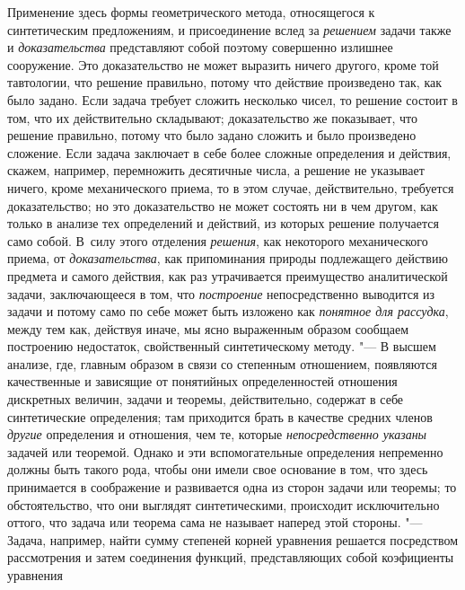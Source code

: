 {{Применение здесь формы геометрического метода, относящегося к
синтетическим предложениям, и присоединение вслед за
{\em решением} задачи
также и {\em доказательства}
представляют собой поэтому совершенно излишнее сооружение.
Это доказательство не может выразить ничего другого, кроме той тавтологии,
что решение правильно, потому что действие произведено так, как было
задано. Если задача требует сложить несколько чисел, то решение состоит в
том, что их действительно складывают; доказательство же показывает, что
решение правильно, потому что было задано сложить и было произведено
сложение. Если задача заключает в себе более сложные определения и
действия, скажем, например, перемножить десятичные
числа,
а решение не указывает ничего, кроме механического приема, то
в этом случае, действительно, требуется доказательство; но это
доказательство не может состоять ни в чем другом, как только в анализе тех
определений и действий, из которых решение получается само собой. В~силу
этого отделения {\em решения},
как некоторого механического приема, от
{\em доказательства}, как
припоминания природы подлежащего действию предмета и самого действия, как
раз утрачивается преимущество аналитической задачи, заключающееся в том,
что {\em построение}
непосредственно выводится из задачи и потому само по себе
может быть изложено как {\em понятное
для рассудка}, между тем как, действуя иначе, мы ясно
выраженным образом сообщаем построению недостаток, свойственный
синтетическому методу. "--- В высшем анализе, где, главным
образом в связи со степенным отношением, появляются качественные и
зависящие от понятийных определенностей отношения дискретных величин,
задачи и теоремы, действительно, содержат в себе синтетические определения;
там приходится брать в качестве средних членов
{\em другие} определения
и отношения, чем те, которые
{\em непосредственно указаны}
задачей или теоремой. Однако и эти вспомогательные
определения непременно должны быть такого рода, чтобы они имели свое
основание в том, что здесь принимается в соображение и развивается одна из
сторон задачи или теоремы; то обстоятельство, что они выглядят
синтетическими, происходит исключительно оттого, что задача или теорема
сама не называет наперед этой стороны. "--- Задача, например,
найти сумму степеней корней уравнения решается посредством рассмотрения и
затем соединения функций, представляющих собой коэфициенты уравнения
}}
